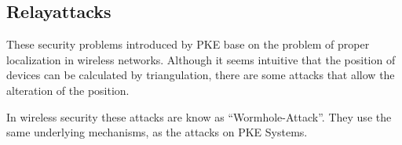 \subsection*{Relayattacks}
These security problems introduced by PKE base on the problem of proper
localization in wireless networks.
Although it seems intuitive that the position of devices can be calculated by
triangulation, there are some attacks that allow the alteration of the position.


In wireless security these attacks are know as ``Wormhole-Attack''.
They use the same underlying mechanisms, as the attacks on PKE Systems.

